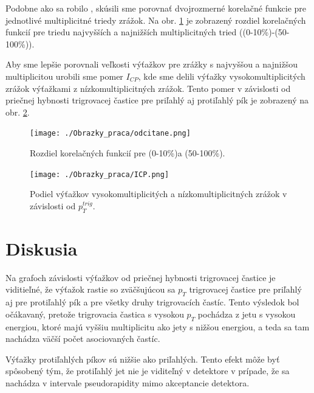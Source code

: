 \documentclass[thesismargins, thesislinespacing]{rnthesis}
\begin{document}
Podobne ako sa robilo \cite{AlicepPb}, skúsili sme porovnať dvojrozmerné korelačné funkcie pre jednotlivé multiplicitné triedy zrážok. Na obr. \ref{multroz} je zobrazený rozdiel korelačných funkcií pre triedu najvyšších a najnižších multiplicitných tried ((0-10\%)-(50-100\%)).

Aby sme lepšie porovnali veľkosti výťažkov pre zrážky s najvyššou a najnižšou multiplicitou urobili sme pomer $I_{CP}$, kde sme delili výťažky vysokomultiplicitých zrážok výťažkami  z nízkomultiplicitných zrážok. Tento pomer v závislosti od priečnej hybnosti trigrovacej častice pre priľahlý aj protiľahlý pík je zobrazený na obr. \ref{Icpnase}. 

\begin{figure}[hbtp!]
	\centering
	\texttt{[image: ./Obrazky\_praca/odcitane.png]}
	\caption{Rozdiel korelačných funkcií pre (0-10\%)a (50-100\%).}
	\label{multroz}
\end{figure}

\begin{figure}[hbtp!]
	\centering
	\texttt{[image: ./Obrazky\_praca/ICP.png]}
	\caption{Podiel výťažkov vysokomultiplicitých a nízkomultiplicitných zrážok v závislosti od $p_{T}^{trig}$.}
	\label{Icpnase}
\end{figure}

\chapter{Diskusia}
 
Na grafoch závislosti výťažkov od priečnej hybnosti trigrovacej častice je viditieľné, že výťažok rastie so zväčšujúcou sa $p_T$ trigrovacej častice pre priľahlý aj pre protiľahlý pík a pre všetky druhy trigrovacích častíc. Tento výsledok bol očákavaný, pretože trigrovacia častica s vysokou $p_T$ pochádza z jetu s vysokou energiou, ktoré majú vyššiu multiplicitu ako jety s nižšou energiou, a teda sa tam nachádza väčší počet asociovaných častíc. 

Výťažky protiľahlých píkov sú nižšie ako priľahlých. Tento efekt môže byť spôsobený tým, že protiľahlý jet nie je viditeľný v detektore v prípade, že sa nachádza v intervale pseudorapidity mimo akceptancie detektora. 
\end{document}
